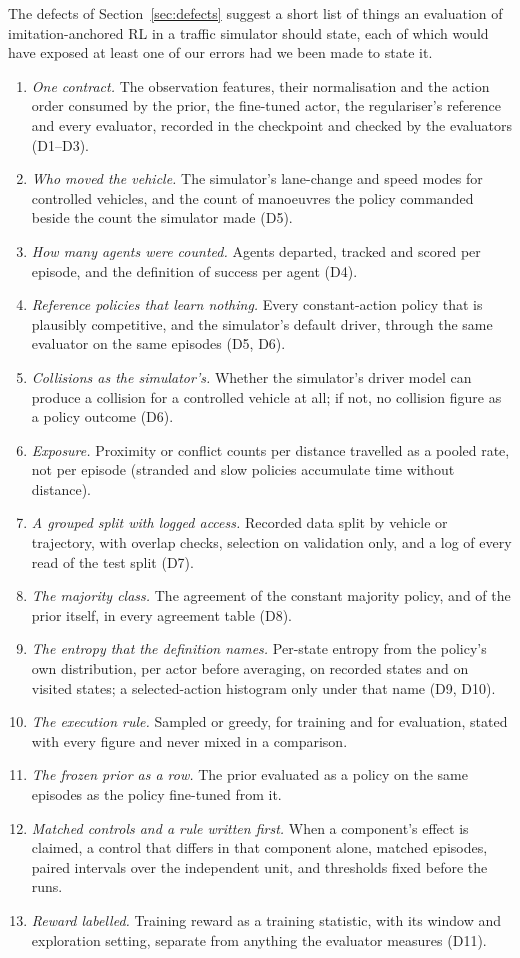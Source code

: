 The defects of Section~\ref{sec:defects} suggest a short list of things an evaluation of imitation-anchored RL in a traffic simulator should state, each of which would have exposed at least one of our errors had we been made to state it.
\begin{enumerate}
  \item \emph{One contract.} The observation features, their normalisation and the action order consumed by the prior, the fine-tuned actor, the regulariser's reference and every evaluator, recorded in the checkpoint and checked by the evaluators (D1--D3).
  \item \emph{Who moved the vehicle.} The simulator's lane-change and speed modes for controlled vehicles, and the count of manoeuvres the policy commanded beside the count the simulator made (D5).
  \item \emph{How many agents were counted.} Agents departed, tracked and scored per episode, and the definition of success per agent (D4).
  \item \emph{Reference policies that learn nothing.} Every constant-action policy that is plausibly competitive, and the simulator's default driver, through the same evaluator on the same episodes (D5, D6).
  \item \emph{Collisions as the simulator's.} Whether the simulator's driver model can produce a collision for a controlled vehicle at all; if not, no collision figure as a policy outcome (D6).
  \item \emph{Exposure.} Proximity or conflict counts per distance travelled as a pooled rate, not per episode (stranded and slow policies accumulate time without distance).
  \item \emph{A grouped split with logged access.} Recorded data split by vehicle or trajectory, with overlap checks, selection on validation only, and a log of every read of the test split (D7).
  \item \emph{The majority class.} The agreement of the constant majority policy, and of the prior itself, in every agreement table (D8).
  \item \emph{The entropy that the definition names.} Per-state entropy from the policy's own distribution, per actor before averaging, on recorded states and on visited states; a selected-action histogram only under that name (D9, D10).
  \item \emph{The execution rule.} Sampled or greedy, for training and for evaluation, stated with every figure and never mixed in a comparison.
  \item \emph{The frozen prior as a row.} The prior evaluated as a policy on the same episodes as the policy fine-tuned from it.
  \item \emph{Matched controls and a rule written first.} When a component's effect is claimed, a control that differs in that component alone, matched episodes, paired intervals over the independent unit, and thresholds fixed before the runs.
  \item \emph{Reward labelled.} Training reward as a training statistic, with its window and exploration setting, separate from anything the evaluator measures (D11).
\end{enumerate}
